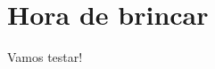 \documentclass[11pt]{beamer}
\begin{document}
\section{Hora de brincar}
	\begin{frame}
		\begin{center}\Huge
			Vamos testar!
		\end{center}
	\end{frame}
\end{document}
